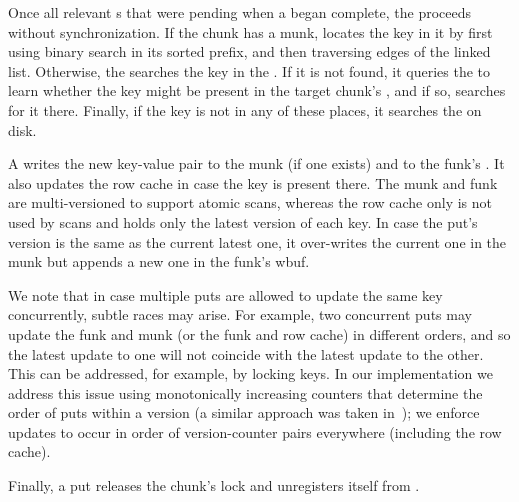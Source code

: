 Once all relevant s that were pending when a   began complete, the 
 proceeds without synchronization. If the chunk has a munk,     locates the key in it by first using binary search in its sorted prefix, and then traversing edges of the linked list. 
Otherwise, the  searches the key in the . If it is not found, it queries 
the  to learn whether the key might be present in the target chunk's  
 , and if so, searches for it there.  Finally, if the key is not in any of these places, it searches
 the   on disk.


A   writes the new key-value pair to the munk (if one exists) and to the funk's . 
It also updates the row cache in case the key is present there. 
The munk and funk are multi-versioned to support atomic scans, 
whereas the row cache only is not used by scans and holds only the latest version of each key. 
In case the put's version is the same as the current latest one, it over-writes the current one in the munk
but appends a new one in the funk's wbuf. 

We note that in case multiple puts are allowed to update the same key concurrently, subtle races may arise. 
For example, two concurrent puts may update the funk and munk (or the funk and row cache) in  different orders,
and so the latest update to one will not coincide with the latest update to the other. 
This can be addressed, for example, by locking
keys. In our implementation we address this issue using monotonically increasing counters that determine 
the order of puts within a version (a similar approach was taken in~\cite{kiwi});  we  enforce 
updates to occur in order of version-counter pairs  everywhere (including the row cache).  

Finally, a put releases the chunk's lock and unregisters itself from .




